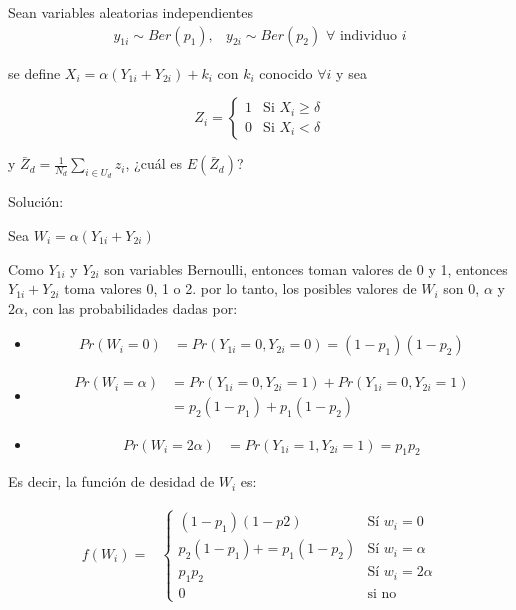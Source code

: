 \documentclass[english]{article}
\begin{document}
Sean variables aleatorias independientes
\begin{align*}
y_{1i}\sim Ber\left(p_{1}\right), & y_{2i}\sim Ber\left(p_{2}\right)\,\,\forall\text{ individuo }i
\end{align*}
 

se define $X_{i}=\alpha\left(Y_{1i}+Y_{2i}\right)+k_{i}$ con $k_{i}$
conocido $\forall i$ y sea 

\[
Z_{i}=\begin{cases}
1 & \text{Si }X_{i}\geq\delta\\
0 & \text{Si }X_{i}<\delta
\end{cases}
\]

y $\bar{Z}_{d}=\frac{1}{N_{d}}\sum_{i\in U_{d}}z_{i}$, ¿cuál es $E\left(\bar{Z}_{d}\right)$?

Soluci\'on: 

Sea $W_{i}=\alpha\left(Y_{1i}+Y_{2i}\right)$

Como $Y_{1i}$ y $Y_{2i}$ son variables Bernoulli, entonces toman
valores de 0 y 1, entonces $Y_{1i}+Y_{2i}$ toma valores 0, 1 o 2.
por lo tanto, los posibles valores de $W_{i}$ son 0, $\alpha$ y
$2\alpha$, con las probabilidades dadas por: 
\begin{itemize}
\item 
\begin{align*}
Pr\left(W_{i}=0\right) & =Pr\left(Y_{1i}=0,Y_{2i}=0\right)=\left(1-p_{1}\right)\left(1-p_{2}\right)
\end{align*}
\item 
\begin{align*}
Pr\left(W_{i}=\alpha\right) & =Pr\left(Y_{1i}=0,Y_{2i}=1\right)+Pr\left(Y_{1i}=0,Y_{2i}=1\right)\\
 & =p_{2}\left(1-p_{1}\right)+p_{1}\left(1-p_{2}\right)
\end{align*}
\item 
\begin{align*}
Pr\left(W_{i}=2\alpha\right) & =Pr\left(Y_{1i}=1,Y_{2i}=1\right)=p_{1}p_{2}
\end{align*}
\end{itemize}
Es decir, la funci\'on de desidad de $W_{i}$ es:

\begin{align*}
f\left(W_{i}\right)= & \begin{cases}
\left(1-p_{1}\right)\left(1-p2\right) & \text{S\'i }w_{i}=0\\
p_{2}\left(1-p_{1}\right)+=p_{1}\left(1-p_{2}\right) & \text{S\'i }w_{i}=\alpha\\
p_{1}p_{2} & \text{S\'i }w_{i}=2\alpha\\
0 & \text{si no}
\end{cases}
\end{align*}
\end{document}
